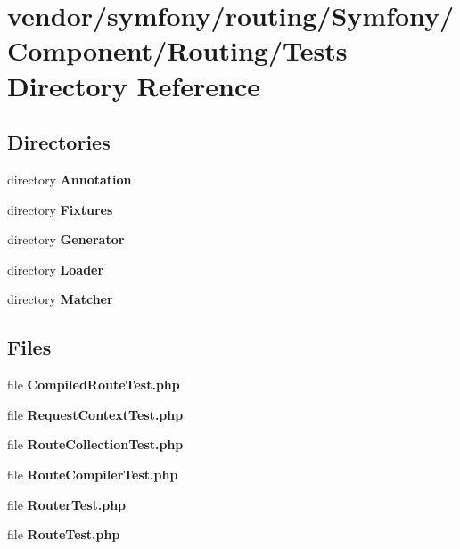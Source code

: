 \section{vendor/symfony/routing/\+Symfony/\+Component/\+Routing/\+Tests Directory Reference}
\label{dir_ef44356c698fc8768ee09f036a06477f}
\subsection*{Directories}
\begin{DoxyCompactItemize}
\item 
directory {\bf Annotation}
\item 
directory {\bf Fixtures}
\item 
directory {\bf Generator}
\item 
directory {\bf Loader}
\item 
directory {\bf Matcher}
\end{DoxyCompactItemize}
\subsection*{Files}
\begin{DoxyCompactItemize}
\item 
file {\bf Compiled\+Route\+Test.\+php}
\item 
file {\bf Request\+Context\+Test.\+php}
\item 
file {\bf Route\+Collection\+Test.\+php}
\item 
file {\bf Route\+Compiler\+Test.\+php}
\item 
file {\bf Router\+Test.\+php}
\item 
file {\bf Route\+Test.\+php}
\end{DoxyCompactItemize}

